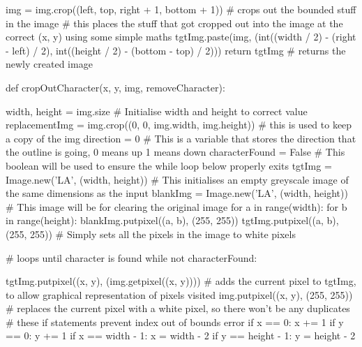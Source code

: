 \documentclass{report}
\begin{document}
\begin{python}
    img = img.crop((left, top, right + 1, bottom + 1))  # crops out the bounded stuff in the image
    # this places the stuff that got cropped out into the image at the correct (x, y) using some simple maths
    tgtImg.paste(img, (int((width / 2) - (right - left) / 2), int((height / 2) - (bottom - top) / 2)))
    return tgtImg  # returns the newly created image


def cropOutCharacter(x, y, img, removeCharacter):

    width, height = img.size  # Initialise width and height to correct value
    replacementImg = img.crop((0, 0, img.width, img.height))  # this is used to keep a copy of the img
    direction = 0  # This is a variable that stores the direction that the outline is going, 0 means up 1 means down
    characterFound = False  # This boolean will be used to ensure the while loop below properly exits
    tgtImg = Image.new('LA', (width, height))  # This initialises an empty greyscale image of the same dimensions as the input
    blankImg = Image.new('LA', (width, height))  # This image will be for clearing the original image
    for a in range(width):
        for b in range(height):
            blankImg.putpixel((a, b), (255, 255))
            tgtImg.putpixel((a, b), (255, 255))  # Simply sets all the pixels in the image to white pixels

    # loops until character is found
    while not characterFound:

        tgtImg.putpixel((x, y), (img.getpixel((x, y))))  # adds the current pixel to tgtImg, to allow graphical representation of pixels visited
        img.putpixel((x, y), (255, 255))  # replaces the current pixel with a white pixel, so there won't be any duplicates
        #  these if statements prevent index out of bounds error
        if x == 0:
            x += 1
        if y == 0:
            y += 1
        if x == width - 1:
            x = width - 2
        if y == height - 1:
            y = height - 2


\end{python}
\end{document}
